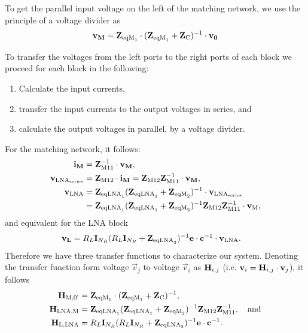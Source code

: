 To get the parallel input voltage on the left of the matching network, we use the principle of a voltage divider as
\begin{equation}
\mathbf{v_M} = \mathbf{Z}_{\text{eqM}_1}\cdot(\mathbf{Z}_{\text{eqM}_1} + \mathbf{Z}_\text{C})^{-1} \cdot \mathbf{v_0}
\end{equation}

To transfer the voltages from the left ports to the right ports of each block we proceed for each block in the following: 
\begin{enumerate}
\item{Calculate the input currents,}
\item{transfer the input currents to the output voltages in series, and}
\item{calculate the output voltages in parallel, by a voltage divider.}
\end{enumerate}
For the matching network, it follows:
\begin{align}
\mathbf{i_M} &= \mathbf{Z}_\text{M11}^{-1}\cdot\mathbf{v_M},\\
\mathbf{v}_{\text{LNA}_\text{series}} &= \mathbf{Z}_\text{M12}\cdot\mathbf{i_M} = \mathbf{Z}_\text{M12} \mathbf{Z}_\text{M11}^{-1}\cdot\mathbf{v_M},\\
\mathbf{v}_\text{LNA} &= \mathbf{Z}_{\text{eqLNA}_1}(\mathbf{Z}_{\text{eqLNA}_1}+\mathbf{Z}_{\text{eqM}_2})^{-1}\cdot\mathbf{v}_{\text{LNA}_\text{series}}\\\nonumber
&=\mathbf{Z}_{\text{eqLNA}_1}(\mathbf{Z}_{\text{eqLNA}_1}+\mathbf{Z}_{\text{eqM}_2})^{-1}\mathbf{Z}_\text{M12} \mathbf{Z}_\text{M11}^{-1}\cdot\mathbf{v}_\text{M},
\end{align}
and equivalent for the LNA block
\begin{align}
\mathbf{v_{L}}&=R_L\mathbf{I}_{N_R}(R_L\mathbf{I}_{N_R}+\mathbf{Z}_{\text{eqLNA}_2})^{-1}\mathbf{e}\cdot\mathbf{c}^{-1}\cdot\mathbf{v}_\text{LNA}.
\end{align}
Therefore we have three transfer functions to characterize our system.
Denoting the transfer function form voltage $\vec{v}_j$ to voltage $\vec{v}_i$ as $\mathbf{H}_{i,j}$ (i.e. $\mathbf{v}_i = \mathbf{H}_{i,j} \cdot\mathbf{v}_j$), it follows
\begin{align}
\mathbf{H}_\text{M,0'} &= \mathbf{Z}_{\text{eqM}_1}\cdot(\mathbf{Z}_{\text{eqM}_1} + \mathbf{Z}_\text{C})^{-1}, \\
\mathbf{H}_\text{LNA,M} &= \mathbf{Z}_{\text{eqLNA}_1}(\mathbf{Z}_{\text{eqLNA}_1}+\mathbf{Z}_{\text{eqM}_2})^{-1}\mathbf{Z}_\text{M12} \mathbf{Z}_\text{M11}^{-1},\quad\text{and}\\
\mathbf{H}_\text{L,LNA} &= R_L\mathbf{I}_{N_R}(R_L\mathbf{I}_{N_R}+\mathbf{Z}_{\text{eqLNA}_2})^{-1}\mathbf{e}\cdot\mathbf{c}^{-1}.
\end{align}

